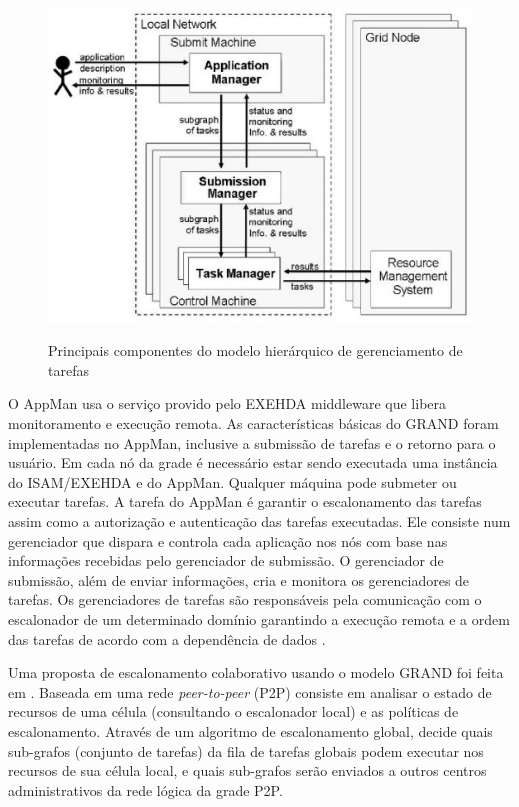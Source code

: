 \begin{figure}[h]
\center
\includegraphics[scale=.6]{img/grand.eps}
\label{grand}
\caption{Principais componentes do modelo hierárquico de gerenciamento de tarefas}
\end{figure}

O AppMan usa o serviço provido pelo EXEHDA middleware \cite{Nino2006} que libera monitoramento e execução remota. As características básicas do GRAND foram implementadas no AppMan, inclusive a submissão de tarefas e o retorno para o usuário. Em cada nó da grade é necessário estar sendo executada uma instância do ISAM/EXEHDA e do AppMan. Qualquer máquina pode submeter ou executar tarefas. A tarefa do AppMan é garantir o escalonamento das tarefas assim como a autorização e autenticação das tarefas executadas. Ele consiste num gerenciador que dispara e controla cada aplicação nos nós com base nas informações recebidas pelo gerenciador de submissão. O gerenciador de submissão, além de enviar informações, cria e monitora os gerenciadores de tarefas. Os gerenciadores de tarefas são responsáveis pela comunicação com o escalonador de um determinado domínio garantindo a execução remota e a ordem das tarefas de acordo com a dependência de dados \cite{Mangan2006}.

Uma proposta de escalonamento colaborativo usando o modelo GRAND foi feita em \cite{Santos}. Baseada em uma rede \emph{peer-to-peer} (P2P) consiste em analisar o estado de recursos de uma célula (consultando o escalonador local) e as políticas de escalonamento. Através de um algoritmo de escalonamento global, decide quais sub-grafos (conjunto de tarefas) da fila de tarefas globais podem executar nos recursos de sua célula local, e quais sub-grafos serão enviados a outros centros administrativos da rede lógica da grade P2P.

